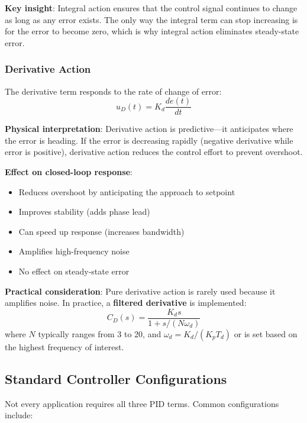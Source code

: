 \textbf{Key insight}: Integral action ensures that the control signal continues to change as long as any error exists. The only way the integral term can stop increasing is for the error to become zero, which is why integral action eliminates steady-state error.

\subsubsection{Derivative Action}

The derivative term responds to the rate of change of error:
\begin{equation}
u_D(t) = K_d \frac{de(t)}{dt}
\end{equation}

\textbf{Physical interpretation}: Derivative action is predictive---it anticipates where the error is heading. If the error is decreasing rapidly (negative derivative while error is positive), derivative action reduces the control effort to prevent overshoot.

\textbf{Effect on closed-loop response}:
\begin{itemize}
    \item Reduces overshoot by anticipating the approach to setpoint
    \item Improves stability (adds phase lead)
    \item Can speed up response (increases bandwidth)
    \item Amplifies high-frequency noise
    \item No effect on steady-state error
\end{itemize}

\textbf{Practical consideration}: Pure derivative action is rarely used because it amplifies noise. In practice, a \textbf{filtered derivative} is implemented:
\begin{equation}
C_D(s) = \frac{K_d s}{1 + s/(N \omega_d)}
\label{eq:filtered_derivative}
\end{equation}
where $N$ typically ranges from 3 to 20, and $\omega_d = K_d / (K_p T_d)$ or is set based on the highest frequency of interest.

\subsection{Standard Controller Configurations}
\label{subsec:controller_configs}

Not every application requires all three PID terms. Common configurations include:

